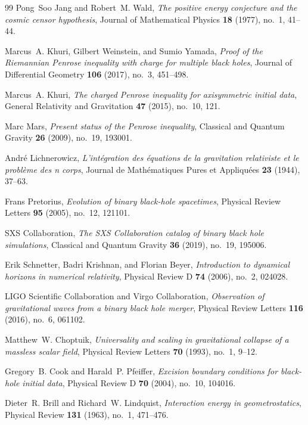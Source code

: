 \documentclass[12pt]{article}
\theoremstyle{plain}
\theoremstyle{definition}
\theoremstyle{remark}
\begin{document}
\begin{thebibliography}{99}
Pong~Soo Jang and Robert~M. Wald, \emph{The positive energy conjecture and the cosmic censor hypothesis}, Journal of Mathematical Physics \textbf{18} (1977), no.~1, 41--44.

Marcus~A. Khuri, Gilbert Weinstein, and Sumio Yamada, \emph{Proof of the Riemannian Penrose inequality with charge for multiple black holes}, Journal of Differential Geometry \textbf{106} (2017), no.~3, 451--498.

Marcus~A. Khuri, \emph{The charged Penrose inequality for axisymmetric initial data}, General Relativity and Gravitation \textbf{47} (2015), no.~10, 121.

Marc Mars, \emph{Present status of the Penrose inequality}, Classical and Quantum Gravity \textbf{26} (2009), no.~19, 193001.

Andr\'e Lichnerowicz, \emph{L'int\'egration des \'equations de la gravitation relativiste et le probl\`eme des n corps}, Journal de Math\'ematiques Pures et Appliqu\'ees \textbf{23} (1944), 37--63.

Frans Pretorius, \emph{Evolution of binary black-hole spacetimes}, Physical Review Letters \textbf{95} (2005), no.~12, 121101.

SXS Collaboration, \emph{The SXS Collaboration catalog of binary black hole simulations}, Classical and Quantum Gravity \textbf{36} (2019), no.~19, 195006.

Erik Schnetter, Badri Krishnan, and Florian Beyer, \emph{Introduction to dynamical horizons in numerical relativity}, Physical Review D \textbf{74} (2006), no.~2, 024028.

LIGO Scientific Collaboration and Virgo Collaboration, \emph{Observation of gravitational waves from a binary black hole merger}, Physical Review Letters \textbf{116} (2016), no.~6, 061102.

Matthew~W. Choptuik, \emph{Universality and scaling in gravitational collapse of a massless scalar field}, Physical Review Letters \textbf{70} (1993), no.~1, 9--12.

Gregory~B. Cook and Harald~P. Pfeiffer, \emph{Excision boundary conditions for black-hole initial data}, Physical Review D \textbf{70} (2004), no.~10, 104016.

Dieter~R. Brill and Richard~W. Lindquist, \emph{Interaction energy in geometrostatics}, Physical Review \textbf{131} (1963), no.~1, 471--476.


\end{thebibliography}
\end{document}
